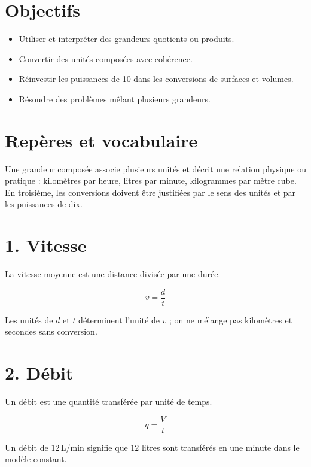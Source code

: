 
\section{Objectifs}
\begin{itemize}
\item Utiliser et interpréter des grandeurs quotients ou produits.
\item Convertir des unités composées avec cohérence.
\item Réinvestir les puissances de 10 dans les conversions de surfaces et volumes.
\item Résoudre des problèmes mêlant plusieurs grandeurs.
\end{itemize}

\section{Repères et vocabulaire}
Une grandeur composée associe plusieurs unités et décrit une relation physique ou pratique : kilomètres par heure, litres par minute, kilogrammes par mètre cube. En troisième, les conversions doivent être justifiées par le sens des unités et par les puissances de dix.

\section{1. Vitesse}
La vitesse moyenne est une distance divisée par une durée.

\[
v=\dfrac dt
\]

\begin{exemple}
Les unités de $d$ et $t$ déterminent l’unité de $v$ ; on ne mélange pas kilomètres et secondes sans conversion.
\end{exemple}

\section{2. Débit}
Un débit est une quantité transférée par unité de temps.

\[
q=\dfrac Vt
\]

\begin{exemple}
Un débit de $12\,\text{L/min}$ signifie que $12$ litres sont transférés en une minute dans le modèle constant.
\end{exemple}


